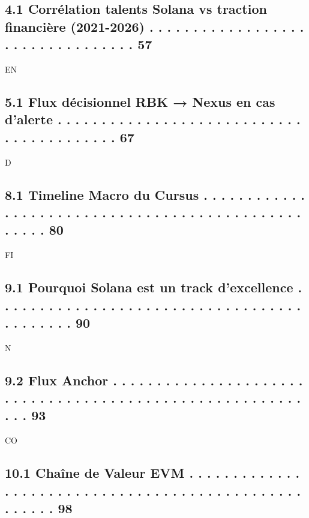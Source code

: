 \subsection{4.1 Corrélation talents Solana vs traction financière (2021-2026) . . . . . . . . . . . . . . . . . . . . . . . . . . . . . . . . .     57}
\vspace{0.5em}
\vspace{0.5em}
\vspace{0.5em}
\vspace{0.5em}
EN\\
\subsection{5.1 Flux décisionnel RBK → Nexus en cas d’alerte . . . . . . . . . . . . . . . . . . . . . . . . . . . . . . . . . . . . . . . . .      67}
\vspace{0.5em}
\vspace{0.5em}
\vspace{0.5em}
\vspace{0.5em}
D\\
\subsection{8.1 Timeline Macro du Cursus . . . . . . . . . . . . . . . . . . . . . . . . . . . . . . . . . . . . . . . . . . . . . . . . . . .      80}
\vspace{0.5em}
\vspace{0.5em}
\vspace{0.5em}
\vspace{0.5em}
FI\\
\subsection{9.1 Pourquoi Solana est un track d’excellence . . . . . . . . . . . . . . . . . . . . . . . . . . . . . . . . . . . . . . . . . . .     90}
\vspace{0.5em}
N\\
\subsection{9.2 Flux Anchor . . . . . . . . . . . . . . . . . . . . . . . . . . . . . . . . . . . . . . . . . . . . . . . . . . . . . . . . . . .   93}
CO\\
\subsection{10.1 Chaîne de Valeur EVM . . . . . . . . . . . . . . . . . . . . . . . . . . . . . . . . . . . . . . . . . . . . . . . . . . . . .     98}
\vspace{0.5em}
